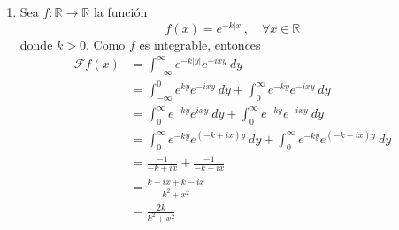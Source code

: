 \documentclass[12pt]{report}
\newcounter{it}
\theoremstyle{largebreak}
\newcommand\abs[1]{\ensuremath{\left|#1\right|}}
\newcommand\cf[3]{\ensuremath{#1:#2\rightarrow#3}}
\newcommand{\fou}[1]{\ensuremath{\mathcal{F}#1}}
\begin{document}
\begin{exa}
\begin{enumerate}
            \item Sea $\cf{f}{\mathbb{R}}{\mathbb{R}}$ la función
            \begin{equation*}
                f(x)=e^{-k\abs{x}},\quad\forall x\in\mathbb{R}
            \end{equation*}
            donde $k>0$. Como $f$ es integrable, entonces
            \begin{equation*}
                \begin{split}
                    \fou{f}(x)&=\int_{-\infty}^\infty e^{-k\abs{y}}e^{-ixy}\:dy\\
                    &=\int_{-\infty}^0 e^{ky}e^{-ixy}\:dy+\int_{0}^\infty e^{-ky}e^{-ixy}\:dy\\
                    &=\int_{0}^\infty e^{-ky}e^{ixy}\:dy+\int_{0}^\infty e^{-ky}e^{-ixy}\:dy\\
                    &=\int_{0}^\infty e^{-ky}e^{(-k+ix)y}\:dy+\int_{0}^\infty e^{-ky}e^{(-k-ix)y}\:dy\\
                    &=\frac{-1}{-k+ix}+\frac{-1}{-k-ix}\\
                    &=\frac{k+ix+k-ix}{k^2+x^2}\\
                    &=\frac{2k}{k^2+x^2}\\
                \end{split}
            \end{equation*}
        \end{enumerate}
    \end{exa}
\end{document}

